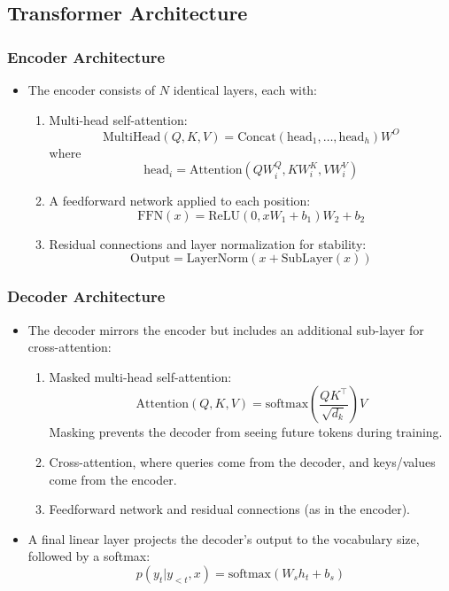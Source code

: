 \subsection{Transformer Architecture}

\subsubsection{Encoder Architecture}
\begin{itemize}
    \item The encoder consists of \( N \) identical layers, each with:
    \begin{enumerate}
        \item Multi-head self-attention:
        \[
        \text{MultiHead}(Q, K, V) = \text{Concat}(\text{head}_1, \ldots, \text{head}_h)W^O
        \]
        where
        \[
        \text{head}_i = \text{Attention}(QW_i^Q, KW_i^K, VW_i^V)
        \]
        \item A feedforward network applied to each position:
        \[
        \text{FFN}(x) = \text{ReLU}(0, xW_1 + b_1)W_2 + b_2
        \]
        \item Residual connections and layer normalization for stability:
        \[
        \text{Output} = \text{LayerNorm}(x + \text{SubLayer}(x))
        \]
    \end{enumerate}
\end{itemize}

\subsubsection{Decoder Architecture}
\begin{itemize}
    \item The decoder mirrors the encoder but includes an additional sub-layer for cross-attention:
    \begin{enumerate}
        \item Masked multi-head self-attention:
        \[
        \text{Attention}(Q, K, V) = \text{softmax}\left(\frac{QK^\top}{\sqrt{d_k}}\right)V
        \]
        Masking prevents the decoder from seeing future tokens during training.
        \item Cross-attention, where queries come from the decoder, and keys/values come from the encoder.
        \item Feedforward network and residual connections (as in the encoder).
    \end{enumerate}
    \item A final linear layer projects the decoder's output to the vocabulary size, followed by a softmax:
    \[
    p(y_t | y_{<t}, x) = \text{softmax}(W_s h_t + b_s)
    \]
\end{itemize}

